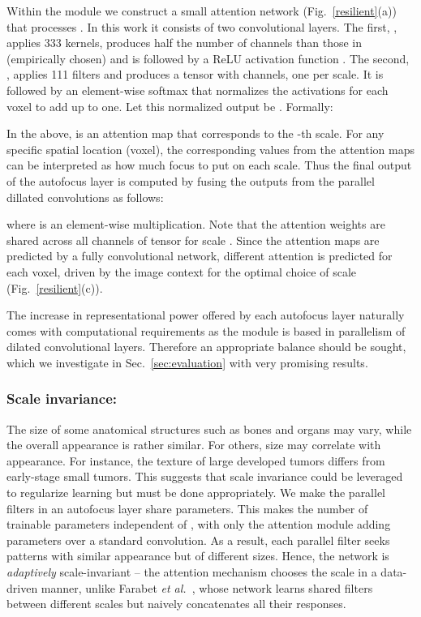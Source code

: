 \documentclass{llncs}
\begin{document}
Within the module we construct a small attention network (Fig.~\ref{resilient}(a)) that processes . In this work it consists of two convolutional layers. The first, , applies 333 kernels, produces half the number of channels than those in  (empirically chosen) and is followed by a ReLU activation function . The second, , applies 111 filters and produces a tensor with  channels, one per scale. It is followed by an element-wise softmax  that normalizes the  activations for each voxel to add up to one. Let this normalized output be . Formally:
\vspace{-2mm}


In the above,  is an attention map that corresponds to the -th scale. For any specific spatial location (voxel), the corresponding  values from the  attention maps  can be interpreted as how much focus to put on each scale. Thus the final output of the autofocus layer is computed by fusing the outputs from the parallel dillated convolutions as follows:
\vspace{-3mm}

where  is an element-wise multiplication. Note that the attention weights  are shared across all channels of tensor  for scale . Since the attention maps are predicted by a fully convolutional network, different attention is predicted for each voxel, driven by the image context for the optimal choice of scale (Fig.~\ref{resilient}(c)).

The increase in representational power offered by each autofocus layer naturally comes with computational requirements as the module is based in parallelism of  dilated convolutional layers. Therefore an appropriate balance should be sought, which we investigate in Sec.~\ref{sec:evaluation} with very promising results. 

\vspace{-3mm}
\subsubsection{Scale invariance:}

The size of some anatomical structures such as bones and organs may vary, while the overall appearance is rather similar. For others, size may correlate with appearance. For instance, the texture of large developed tumors differs from early-stage small tumors. This suggests that scale invariance could be leveraged to regularize learning but must be done appropriately. We make the parallel filters in an autofocus layer share parameters. This makes the number of trainable parameters independent of , with only the attention module adding parameters over a standard convolution. As a result, each parallel filter seeks patterns with similar appearance but of different sizes. Hence, the network is \textit{adaptively} scale-invariant -- the attention mechanism chooses the scale in a data-driven manner, unlike Farabet \emph{et al.}~\cite{farabet2013learning}, whose network learns shared filters between different scales but naively concatenates all their responses.
\end{document}
